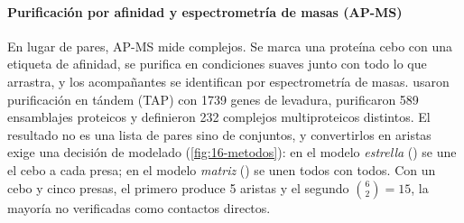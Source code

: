\paragraph{Purificación por afinidad y espectrometría de masas (AP-MS)} En lugar de pares, AP-MS mide complejos. Se marca una proteína cebo con una etiqueta de afinidad, se purifica en condiciones suaves junto con todo lo que arrastra, y los acompañantes se identifican por espectrometría de masas. \textcite{c16-gavin2002} usaron purificación en tándem (TAP) con \num{1739} genes de levadura, purificaron 589 ensamblajes proteicos y definieron 232 complejos multiproteicos distintos. El resultado no es una lista de pares sino de conjuntos, y convertirlos en aristas exige una decisión de modelado (\cref{fig:16-metodos}): en el modelo \emph{estrella} () se une el cebo a cada presa; en el modelo \emph{matriz} () se unen todos con todos. Con un cebo y cinco presas, el primero produce 5 aristas y el segundo $\binom{6}{2}=15$, la mayoría no verificadas como contactos directos.

